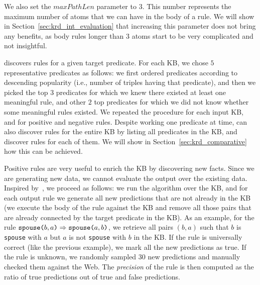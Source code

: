 We also set the $maxPathLen$ parameter to $3$. This number represents the maximum number of atoms that we can have in the body of a rule. We will show in Section~\ref{sec:krd_int_evaluation} that increasing this parameter does not bring any benefits, as body rules longer than $3$ atoms start to be very complicated and not insightful.

\krd discovers rules for a given target predicate. For each KB, we chose $5$ representative predicates as follows: we first ordered predicates according to descending popularity (i.e., number of triples having that predicate), and then we picked the top $3$ predicates for which we knew there existed at least one meaningful rule, and other $2$ top predicates for which we did not know whether some meaningful rules existed. We repeated the procedure for each input KB, and for positive and negative rules. Despite working one predicate at time, \krd can also discover rules for the entire KB by listing all predicates in the KB, and discover rules for each of them. We will show in Section~\ref{sec:krd_comparative} how this can be achieved.

Positive rules are very useful to enrich the KB by discovering new facts. Since we are generating new data, we cannot evaluate the output over the existing data. Inspired by~\cite{galarraga2015fast}, we proceed as follows: we run the algorithm over the KB, and for each output rule we generate all new predictions that are not already in the KB (we execute the body of the rule against the KB and remove all those pairs that are already connected by the target predicate in the KB). As an example, for the rule $\texttt{spouse(}b,a\texttt{)} \Rightarrow \texttt{spouse(}a,b\texttt{)}$, we retrieve all pairs $(b,a)$ such that $b$ is \texttt{spouse} with $a$ but $a$ is not \texttt{spouse} with $b$ in the KB. If the rule is universally correct (like the previous example), we mark all the new predictions as true. If the rule is unknown, we randomly sampled 30 new predictions and manually checked them against the Web. The \emph{precision} of the rule is then computed as the ratio of true predictions out of true and false predictions.


